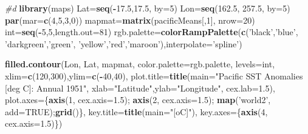 \documentclass[]{article}
\newenvironment{Shaded}{\begin{snugshade}}{\end{snugshade}}
\newcommand{\KeywordTok}[1]{\textcolor[rgb]{0.13,0.29,0.53}{\textbf{#1}}}
\newcommand{\DataTypeTok}[1]{\textcolor[rgb]{0.13,0.29,0.53}{#1}}
\newcommand{\DecValTok}[1]{\textcolor[rgb]{0.00,0.00,0.81}{#1}}
\newcommand{\FloatTok}[1]{\textcolor[rgb]{0.00,0.00,0.81}{#1}}
\newcommand{\StringTok}[1]{\textcolor[rgb]{0.31,0.60,0.02}{#1}}
\newcommand{\CommentTok}[1]{\textcolor[rgb]{0.56,0.35,0.01}{\textit{#1}}}
\newcommand{\OtherTok}[1]{\textcolor[rgb]{0.56,0.35,0.01}{#1}}
\newcommand{\OperatorTok}[1]{\textcolor[rgb]{0.81,0.36,0.00}{\textbf{#1}}}
\newcommand{\NormalTok}[1]{#1}
\begin{document}
\begin{Shaded}
\begin{Highlighting}[]
\CommentTok{#d}
\KeywordTok{library}\NormalTok{(maps)}
\NormalTok{Lat=}\KeywordTok{seq}\NormalTok{(}\OperatorTok{-}\FloatTok{17.5}\NormalTok{,}\FloatTok{17.5}\NormalTok{, }\DataTypeTok{by=}\DecValTok{5}\NormalTok{)}
\NormalTok{Lon=}\KeywordTok{seq}\NormalTok{(}\FloatTok{162.5}\NormalTok{, }\FloatTok{257.5}\NormalTok{, }\DataTypeTok{by=}\DecValTok{5}\NormalTok{)}
\KeywordTok{par}\NormalTok{(}\DataTypeTok{mar=}\KeywordTok{c}\NormalTok{(}\DecValTok{4}\NormalTok{,}\DecValTok{5}\NormalTok{,}\DecValTok{3}\NormalTok{,}\DecValTok{0}\NormalTok{))}
\NormalTok{mapmat=}\KeywordTok{matrix}\NormalTok{(pacificMeans[,}\DecValTok{1}\NormalTok{], }\DataTypeTok{nrow=}\DecValTok{20}\NormalTok{)}
\NormalTok{int=}\KeywordTok{seq}\NormalTok{(}\OperatorTok{-}\DecValTok{5}\NormalTok{,}\DecValTok{5}\NormalTok{,}\DataTypeTok{length.out=}\DecValTok{81}\NormalTok{)}
\NormalTok{rgb.palette=}\KeywordTok{colorRampPalette}\NormalTok{(}\KeywordTok{c}\NormalTok{(}\StringTok{'black'}\NormalTok{,}\StringTok{'blue'}\NormalTok{, }\StringTok{'darkgreen'}\NormalTok{,}\StringTok{'green'}\NormalTok{, }\StringTok{'yellow'}\NormalTok{,}\StringTok{'red'}\NormalTok{,}\StringTok{'maroon'}\NormalTok{),}\DataTypeTok{interpolate=}\StringTok{'spline'}\NormalTok{)}

\KeywordTok{filled.contour}\NormalTok{(Lon, Lat, mapmat, }\DataTypeTok{color.palette=}\NormalTok{rgb.palette, }\DataTypeTok{levels=}\NormalTok{int,}
               \DataTypeTok{xlim=}\KeywordTok{c}\NormalTok{(}\DecValTok{120}\NormalTok{,}\DecValTok{300}\NormalTok{),}\DataTypeTok{ylim=}\KeywordTok{c}\NormalTok{(}\OperatorTok{-}\DecValTok{40}\NormalTok{,}\DecValTok{40}\NormalTok{),}
               \DataTypeTok{plot.title=}\KeywordTok{title}\NormalTok{(}\DataTypeTok{main=}\StringTok{"Pacific SST Anomalies [deg C]: Annual 1951"}\NormalTok{,}
                                \DataTypeTok{xlab=}\StringTok{"Latitude"}\NormalTok{,}\DataTypeTok{ylab=}\StringTok{"Longitude"}\NormalTok{, }\DataTypeTok{cex.lab=}\FloatTok{1.5}\NormalTok{),}
               \DataTypeTok{plot.axes=}\NormalTok{\{}\KeywordTok{axis}\NormalTok{(}\DecValTok{1}\NormalTok{, }\DataTypeTok{cex.axis=}\FloatTok{1.5}\NormalTok{); }\KeywordTok{axis}\NormalTok{(}\DecValTok{2}\NormalTok{, }\DataTypeTok{cex.axis=}\FloatTok{1.5}\NormalTok{);}
                 \KeywordTok{map}\NormalTok{(}\StringTok{'world2'}\NormalTok{, }\DataTypeTok{add=}\OtherTok{TRUE}\NormalTok{);}\KeywordTok{grid}\NormalTok{()\},}
               \DataTypeTok{key.title=}\KeywordTok{title}\NormalTok{(}\DataTypeTok{main=}\StringTok{"[oC]"}\NormalTok{),}
               \DataTypeTok{key.axes=}\NormalTok{\{}\KeywordTok{axis}\NormalTok{(}\DecValTok{4}\NormalTok{, }\DataTypeTok{cex.axis=}\FloatTok{1.5}\NormalTok{)\})}
\end{Highlighting}
\end{Shaded}
\end{document}
